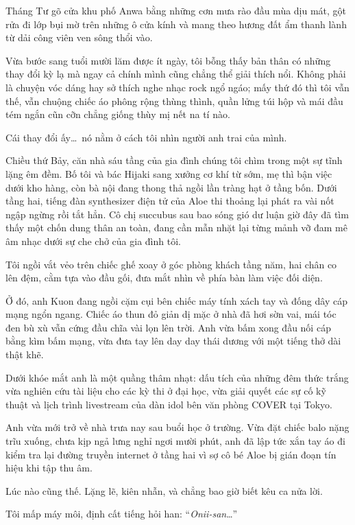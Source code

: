 ﻿\documentclass[../main.tex]{subfiles}
\begin{document}

Tháng Tư gõ cửa khu phố Anwa bằng những cơn mưa rào đầu mùa dịu mát, gột rửa đi lớp bụi mờ trên những ô cửa kính và mang theo hương đất ẩm thanh lành từ dải công viên ven sông thổi vào.

Vừa bước sang tuổi mười lăm được ít ngày, tôi bỗng thấy bản thân có những thay đổi kỳ lạ mà ngay cả chính mình cũng chẳng thể giải thích nổi. Không phải là chuyện vóc dáng hay sở thích nghe nhạc rock ngổ ngáo; mấy thứ đó thì tôi vẫn thế, vẫn chuộng chiếc áo phông rộng thùng thình, quần lửng túi hộp và mái đầu tém ngắn cũn cỡn chẳng giống thùy mị nết na tí nào.

Cái thay đổi ấy\dots\ nó nằm ở cách tôi nhìn người anh trai của mình.

Chiều thứ Bảy, căn nhà sáu tầng của gia đình chúng tôi chìm trong một sự tĩnh lặng êm đềm. Bố tôi và bác Hijaki sang xưởng cơ khí từ sớm, mẹ thì bận việc dưới kho hàng, còn bà nội đang thong thả ngồi lần tràng hạt ở tầng bốn. Dưới tầng hai, tiếng đàn synthesizer điện tử của Aloe thi thoảng lại phát ra vài nốt ngập ngừng rồi tắt hẳn. Cô chị succubus sau bao sóng gió dư luận giờ đây đã tìm thấy một chốn dung thân an toàn, đang cần mẫn nhặt lại từng mảnh vỡ đam mê âm nhạc dưới sự che chở của gia đình tôi.

Tôi ngồi vắt vẻo trên chiếc ghế xoay ở góc phòng khách tầng năm, hai chân co lên đệm, cằm tựa vào đầu gối, đưa mắt nhìn về phía bàn làm việc đối diện.

Ở đó, anh Kuon đang ngồi cặm cụi bên chiếc máy tính xách tay và đống dây cáp mạng ngổn ngang. Chiếc áo thun đỏ giản dị mặc ở nhà đã hơi sờn vai, mái tóc đen bù xù vẫn cứng đầu chĩa vài lọn lên trời. Anh vừa bấm xong đầu nối cáp bằng kìm bấm mạng, vừa đưa tay lên day day thái dương với một tiếng thở dài thật khẽ.

Dưới khóe mắt anh là một quầng thâm nhạt: dấu tích của những đêm thức trắng vừa nghiên cứu tài liệu cho các kỳ thi ở đại học, vừa giải quyết các sự cố kỹ thuật và lịch trình livestream của dàn idol bên văn phòng COVER tại Tokyo.

Anh vừa mới trở về nhà trưa nay sau buổi học ở trường. Vừa đặt chiếc balo nặng trĩu xuống, chưa kịp ngả lưng nghỉ ngơi mười phút, anh đã lập tức xắn tay áo đi kiểm tra lại đường truyền internet ở tầng hai vì sợ cô bé Aloe bị gián đoạn tín hiệu khi tập thu âm.

Lúc nào cũng thế. Lặng lẽ, kiên nhẫn, và chẳng bao giờ biết kêu ca nửa lời.

Tôi mấp máy môi, định cất tiếng hỏi han: ``\textit{Onii-san}\dots''
\end{document}
